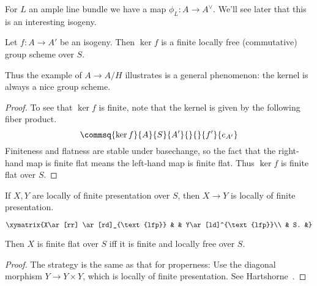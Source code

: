 For $L$ an ample line bundle we have a map $\phi_L:A\to A^{\vee}$. We'll see later that this is an interesting isogeny.
\begin{lem}
Let $f:A\to A'$ be an isogeny. Then $\ker f$ is a finite  locally free (commutative) group scheme over $S$. %
\end{lem}
Thus the example of $A\to A/H$ illustrates is a general phenomenon: the kernel is always a nice group scheme.
\begin{proof}
To see that $\ker f$ is finite, note that the kernel is given by the following fiber product.
\[
\commsq{\ker f}{A}{S}{A'}{}{}{f'}{e_{A'}}
\]
Finiteness and flatness are stable under basechange, so the fact that the right-hand map is finite flat means the left-hand map is finite flat.
Thus $\ker f$ is finite flat over $S$.
\end{proof}
\begin{fct}
If $X,Y$ are locally of finite presentation over $S$, then $X\to Y$ is locally of finite presentation.

\[
\xymatrix{X\ar[rr] \ar[rd]_{\text{lfp}} & & Y\ar[ld]^{\text{lfp}}\\
& S. &}
\]

Then $X$ is finite flat over $S$ iff it is finite and locally free over $S$. 
\end{fct}
\begin{proof}
The strategy is the same as that for properness: 
Use the diagonal morphism $Y\to Y\times Y$, which is locally of finite presentation. See Hartshorne~\cite[Exercise 4.8e]{Ha77}. 
\end{proof}
